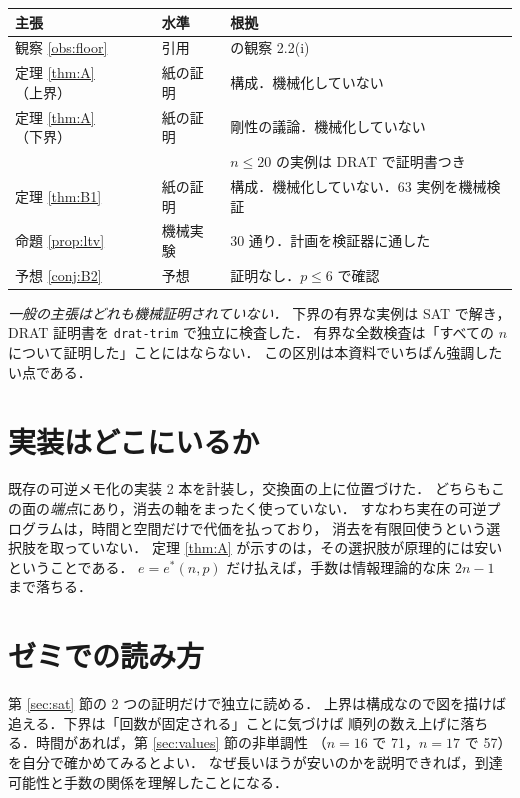 \documentclass[a4paper,11pt]{jsarticle}
\theoremstyle{definition}
\newcommand{\estar}{e^{*}}
\begin{document}
\begin{center}
\begin{tabular}{lll}
\toprule
主張 & 水準 & 根拠 \\
\midrule
観察 \ref{obs:floor} & 引用 & \cite{Knill95} の観察 2.2(i) \\
定理 \ref{thm:A}（上界） & 紙の証明 & 構成．機械化していない \\
定理 \ref{thm:A}（下界） & 紙の証明 & 剛性の議論．機械化していない \\
 & & $n \le 20$ の実例は DRAT で証明書つき \\
定理 \ref{thm:B1} & 紙の証明 & 構成．機械化していない．63 実例を機械検証 \\
命題 \ref{prop:ltv} & 機械実験 & 30 通り．計画を検証器に通した \\
予想 \ref{conj:B2} & 予想 & 証明なし．$p \le 6$ で確認 \\
\bottomrule
\end{tabular}
\end{center}

\emph{一般の主張はどれも機械証明されていない．}
下界の有界な実例は SAT で解き，DRAT 証明書を \texttt{drat-trim} で独立に検査した．
有界な全数検査は「すべての $n$ について証明した」ことにはならない．
この区別は本資料でいちばん強調したい点である．

\section{実装はどこにいるか}\label{sec:impl}
既存の可逆メモ化の実装 2 本を計装し，交換面の上に位置づけた．
どちらもこの面の\emph{端点}にあり，消去の軸をまったく使っていない．
すなわち実在の可逆プログラムは，時間と空間だけで代価を払っており，
消去を有限回使うという選択肢を取っていない．
定理 \ref{thm:A} が示すのは，その選択肢が原理的には安いということである．
$e = \estar(n,p)$ だけ払えば，手数は情報理論的な床 $2n-1$ まで落ちる．

\section{ゼミでの読み方}
第 \ref{sec:sat} 節の 2 つの証明だけで独立に読める．
上界は構成なので図を描けば追える．下界は「回数が固定される」ことに気づけば
順列の数え上げに落ちる．時間があれば，第 \ref{sec:values} 節の非単調性
（$n=16$ で 71，$n=17$ で 57）を自分で確かめてみるとよい．
なぜ長いほうが安いのかを説明できれば，到達可能性と手数の関係を理解したことになる．
\end{document}
